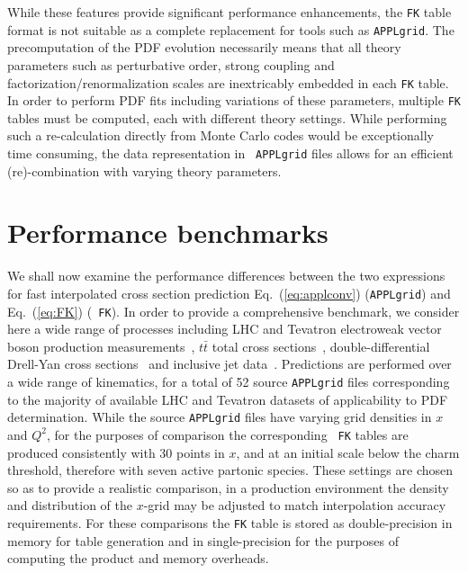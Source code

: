 \documentclass[preprint,12pt]{elsarticle}
\begin{document}
While these features provide significant performance enhancements, the
{\tt FK} table format is not suitable as a complete replacement for
tools such as {\tt APPLgrid}. The precomputation of the PDF evolution
necessarily means that all theory parameters such as perturbative
order, strong coupling and factorization/renormalization scales are
inextricably embedded in each {\tt FK} table. In order to perform PDF
fits including variations of these parameters, multiple {\tt FK}
tables must be computed, each with different theory settings. While
performing such a re-calculation directly from Monte Carlo codes would
be exceptionally time consuming, the data representation in {\tt
  APPLgrid} files allows for an efficient (re)-combination with varying
theory parameters.

\section{Performance benchmarks}
\label{sec:benchmark}

We shall now examine the performance differences between
the two expressions for fast interpolated cross section prediction
Eq.~(\ref{eq:applconv}) ({\tt APPLgrid}) and Eq.~(\ref{eq:FK}) ({\tt
  FK}).
%
In order to provide a comprehensive benchmark, we consider here a wide range of
processes including LHC and Tevatron electroweak vector boson
production
measurements~\cite{Aaij:2012mda,Aaij:2012vn,Chatrchyan:2013mza,Chatrchyan:2013uja,Chatrchyan:2012xt,Aad:2013iua,Aad:2011fp,Aad:2011dm,Aaltonen:2010zza},
$t\bar{t}$ total
cross sections~\cite{ATLAS:2012aa, Chatrchyan:2013faa,Chatrchyan:2012bra,Chatrchyan:2012ria},
double-differential Drell-Yan
cross sections~\cite{Chatrchyan:2013tia,CMS:2014jea} and inclusive jet
data~\cite{Chatrchyan:2012bja,Aad:2011fc,Aad:2013lpa,Abazov:2007jy}. Predictions
are performed over a wide range of kinematics, for a total of 52
source {\tt APPLgrid} files corresponding to the majority of available
LHC and Tevatron datasets of applicability to PDF determination.
While the source {\tt APPLgrid} files have varying grid densities in
$x$ and $Q^2$, for the purposes of comparison the corresponding {\tt
  FK} tables are produced consistently with 30 points in $x$, and at
an initial scale below the charm threshold, therefore with seven
active partonic species. These settings are chosen so as to provide a realistic
comparison, in a production environment the density and distribution of the
$x$-grid may be adjusted to match interpolation accuracy requirements.  For these comparisons the {\tt FK}
table is stored as double-precision in memory for table generation and in
single-precision for the purposes of computing the product and memory overheads.
\end{document}
